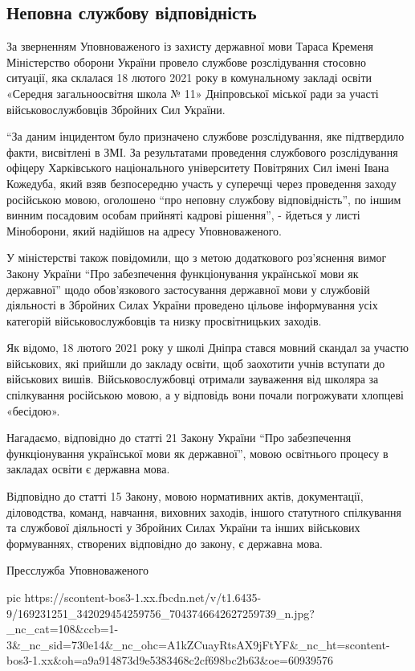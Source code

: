  
 
 
 
 

\subsection{Неповна службову відповідність}

За зверненням Уповноваженого із захисту державної мови Тараса Кременя
Міністерство оборони України провело службове розслідування стосовно ситуації,
яка склалася 18 лютого 2021 року в комунальному закладі освіти «Середня
загальноосвітня школа № 11» Дніпровської міської ради за участі
військовослужбовців Збройних Сил України.

“За даним інцидентом було призначено службове розслідування, яке підтвердило
факти, висвітлені в ЗМІ. За результатами проведення службового розслідування
офіцеру Харківського національного університету Повітряних Сил імені Івана
Кожедуба, який взяв безпосередню участь у суперечці через проведення заходу
російською мовою, оголошено “про неповну службову відповідність”, по іншим
винним посадовим особам прийняті кадрові рішення”, - йдеться у листі
Міноборони, який надійшов на адресу Уповноваженого.

У міністерстві також повідомили, що з метою додаткового роз'яснення вимог
Закону України “Про забезпечення функціонування української мови як державної”
щодо обов'язкового застосування державної мови у службовій діяльності в
Збройних Силах України проведено цільове інформування усіх категорій
військовослужбовців та низку просвітницьких заходів. 

Як відомо, 18 лютого 2021 року у школі Дніпра стався мовний скандал за участю
військових, які прийшли до закладу освіти, щоб заохотити учнів вступати до
військових вишів. Військовослужбовці отримали зауваження від школяра за
спілкування російською мовою, а у відповідь вони почали погрожувати хлопцеві
«бесідою».

Нагадаємо, відповідно до статті 21 Закону України “Про забезпечення
функціонування української мови як державної”, мовою освітнього процесу в
закладах освіти є державна мова.

Відповідно до статті 15 Закону, мовою нормативних актів, документації,
діловодства, команд, навчання, виховних заходів, іншого статутного спілкування
та службової діяльності у Збройних Силах України та інших військових
формуваннях, створених відповідно до закону, є державна мова.

Пресслужба Уповноваженого

\ifcmt
  pic https://scontent-bos3-1.xx.fbcdn.net/v/t1.6435-9/169231251_342029454259756_7043746642627259739_n.jpg?_nc_cat=108&ccb=1-3&_nc_sid=730e14&_nc_ohc=A1kZCuayRtsAX9jFtYF&_nc_ht=scontent-bos3-1.xx&oh=a9a914873d9e5383468c2cf698bc2b63&oe=60939576
\fi

